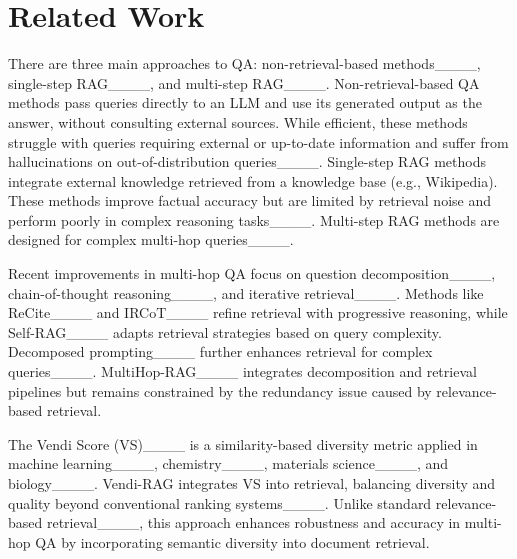 \section{Related Work}
\label{sec:related}

 There are three main approaches to QA: non-retrieval-based methods____, single-step RAG____, and multi-step RAG____. Non-retrieval-based QA methods pass queries directly to an LLM and use its generated output as the answer, without consulting external sources. While efficient, these methods struggle with queries requiring external or up-to-date information and suffer from hallucinations on out-of-distribution queries____. Single-step RAG methods integrate external knowledge retrieved from a knowledge base (e.g., Wikipedia). These methods improve factual accuracy but are limited by retrieval noise and perform poorly in complex reasoning tasks____. Multi-step RAG methods are designed for complex multi-hop queries____. 

Recent improvements in multi-hop QA focus on question decomposition____, chain-of-thought reasoning____, and iterative retrieval____. Methods like ReCite____ and IRCoT____ refine retrieval with progressive reasoning, while Self-RAG____ adapts retrieval strategies based on query complexity. Decomposed prompting____ further enhances retrieval for complex queries____. MultiHop-RAG____ integrates decomposition and retrieval pipelines but remains constrained by the redundancy issue caused by relevance-based retrieval.  

 The Vendi Score (VS)____ is a similarity-based diversity metric applied in machine learning____, chemistry____, materials science____, and biology____. Vendi-RAG integrates VS into retrieval, balancing diversity and quality beyond conventional ranking systems____. Unlike standard relevance-based retrieval____, this approach enhances robustness and accuracy in multi-hop QA by incorporating semantic diversity into document retrieval.